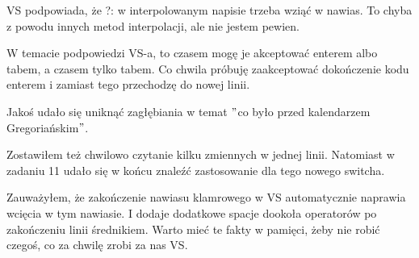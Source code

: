 \documentclass[10pt]{article}
\begin{document}
VS podpowiada, że ?: w interpolowanym napisie trzeba wziąć w nawias. To chyba z powodu innych metod interpolacji, ale nie jestem pewien.

W temacie podpowiedzi VS-a, to czasem mogę je akceptować enterem albo tabem, a czasem tylko tabem. Co chwila próbuję zaakceptować dokończenie kodu enterem i zamiast tego przechodzę do nowej linii.

Jakoś udało się uniknąć zagłębiania w temat $"$co było przed kalendarzem Gregoriańskim$"$.

Zostawiłem też chwilowo czytanie kilku zmiennych w jednej linii. Natomiast w zadaniu 11 udało się w końcu znaleźć zastosowanie dla tego nowego switcha.

Zauważyłem, że zakończenie nawiasu klamrowego w VS automatycznie naprawia wcięcia w tym nawiasie. I dodaje dodatkowe spacje dookoła operatorów po zakończeniu linii średnikiem. Warto mieć te fakty w pamięci, żeby nie robić czegoś, co za chwilę zrobi za nas VS.
\end{document}
